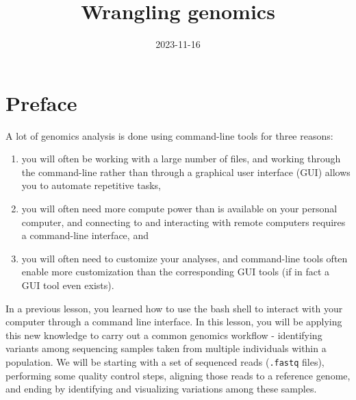 \documentclass[
  letterpaper,
  DIV=11,
  numbers=noendperiod]{scrreprt}
\title{Wrangling genomics}
\author{}
\date{2023-11-16}
\renewcommand*\contentsname{Table of contents}
\newcommand\contentsname{Table of contents}
\begin{document}
\maketitle
\ifdefined\Shaded\renewenvironment{Shaded}{\begin{tcolorbox}[breakable, enhanced, borderline west={3pt}{0pt}{shadecolor}, interior hidden, boxrule=0pt, sharp corners, frame hidden]}{\end{tcolorbox}}\fi

\renewcommand*\contentsname{Table of contents}
{
\hypersetup{linkcolor=}
\setcounter{tocdepth}{2}
\tableofcontents
}

\hypertarget{preface}{%
\chapter*{Preface}\label{preface}}


A lot of genomics analysis is done using command-line tools for three
reasons:

\begin{enumerate}
\def\labelenumi{\arabic{enumi}.}
\item
  you will often be working with a large number of files, and working
  through the command-line rather than through a graphical user
  interface (GUI) allows you to automate repetitive tasks,
\item
  you will often need more compute power than is available on your
  personal computer, and connecting to and interacting with remote
  computers requires a command-line interface, and
\item
  you will often need to customize your analyses, and command-line tools
  often enable more customization than the corresponding GUI tools (if
  in fact a GUI tool even exists).
\end{enumerate}

In a previous lesson, you learned how to use the bash shell to interact
with your computer through a command line interface. In this lesson, you
will be applying this new knowledge to carry out a common genomics
workflow - identifying variants among sequencing samples taken from
multiple individuals within a population. We will be starting with a set
of sequenced reads (\texttt{.fastq} files), performing some quality
control steps, aligning those reads to a reference genome, and ending by
identifying and visualizing variations among these samples.
\end{document}
